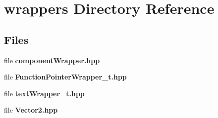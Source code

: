 \section{wrappers Directory Reference}
\label{dir_5cec92fd47c0900910bbc2480fdfd7be}
\subsection*{Files}
\begin{DoxyCompactItemize}
\item 
file \textbf{ component\+Wrapper.\+hpp}
\item 
file \textbf{ Function\+Pointer\+Wrapper\+\_\+t.\+hpp}
\item 
file \textbf{ text\+Wrapper\+\_\+t.\+hpp}
\item 
file \textbf{ Vector2.\+hpp}
\end{DoxyCompactItemize}
